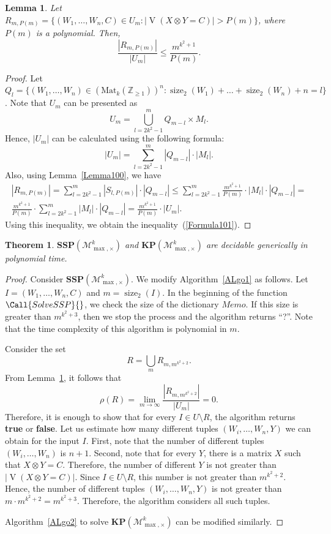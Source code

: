 \documentclass[reqno,12pt]{amsart}
\newtheorem{lemma}{Lemma}
\newtheorem{theorem}{Theorem}
\theoremstyle{definition}
\newcommand{\Mat}{\mathrm{Mat}}
\newcommand{\MT}{\mathcal{M}_{\max, {\times}}^k}
\newcommand{\SSMTP}{\mathbf{SSP}(\MT)}
\newcommand{\KMTP}{\mathbf{KP}(\MT)}
\DeclareMathOperator{\size}{size}
\DeclareMathOperator{\V}{\mathrm{V}}
\begin{document}
\begin{lemma}\label{LemmaRm}
Let $R_{m, P(m)} = \{(W_1, \ldots, W_n, C) \in U_m : |\!\V(X \otimes Y = C)| > P(m)\}$, where $P(m)$ is a polynomial.
Then,
\begin{equation}\label{Formula101}
\frac{|R_{m, P(m)}|}{|U_m|} \leq \frac{m^{k^2 + 1}}{P(m)}.
\end{equation}
\end{lemma}

\begin{proof}
Let $Q_l = \{ (W_1, \ldots, W_n) \in (\Mat_k(\mathbb{Z}_{\geq 1}))^n: \size_2(W_1) + \ldots + \size_2(W_n) + n = l\}$. Note that $U_m$ can be presented as
$$U_m = \bigcup_{l = 2k^2 - 1}^m Q_{m - l} \times M_l.$$ Hence,
$|U_m|$ can be calculated using the following formula:
$$
|U_m| = \sum_{l = 2k^2 - 1}^m |Q_{m - l}| \cdot |M_l|. 
$$
Also, using Lemma~\ref{Lemma100}, we have
\begin{multline*}
|R_{m, P(m)}| = \sum_{l = 2k^2 - 1}^m |S_{l, P(m)}| \cdot |Q_{m - l}|
\leq
\sum_{l = 2k^2 - 1}^m 
\frac{m^{k^2 + 1}}{P(m)}
\cdot|M_l| \cdot |Q_{m - l}|
=\\
\frac{m^{k^2 + 1}}{P(m)}\cdot
\sum_{l = 2k^2 - 1}^m 
|M_l| \cdot |Q_{m - l}|
=
\frac{m^{k^2 + 1}}{P(m)} \cdot |U_m|.
\end{multline*}
Using this inequality, we obtain the inequality~(\ref{Formula101}).
\end{proof}

\begin{theorem}\label{Th3}
$\SSMTP$ and $\KMTP$ are decidable generically in polynomial time.
\end{theorem}
\begin{proof}
Consider $\SSMTP$. We modify Algorithm~\ref{ALgo1} as follows. 
Let $I = (W_1, \ldots, W_n, C)$ and $m = \size_2(I)$.
In the beginning of the function $\Call{SolveSSP}{}$,
we check the size of the dictionary $Memo$. If this size is greater than
$m^{k^2 + 3}$, then we stop the process and the algorithm returns ``?''.
Note that the time complexity of this algorithm is polynomial in $m$.

Consider the set 
$$R = \bigcup_{m}{R_{m, m^{k^2 + 2}}}.$$ From Lemma~\ref{LemmaRm},
 it follows that 
$$\rho(R) = \lim_{m \to \infty}\frac{|R_{m, m^{k^2 + 2}}|}{|U_m|} = 0.$$
Therefore, it is enough to show that for every $I \in U \setminus R$,
the algorithm returns \textbf{true} or \textbf{false}.
Let us estimate how many different tuples $(W_i, \ldots, W_n, Y)$ we can obtain for the input $I$. 
First, note that the number of different tuples $(W_i, \ldots, W_n)$
is $n + 1$. Second, note that for every $Y$, there is a matrix $X$ such that $X \otimes Y = C$. Therefore, the number of different $Y$ is not greater than
$|\!\V(X \otimes Y = C)|$. Since $I\in U \setminus R$, this number is not greater than
$m^{k^2 + 2}$. Hence, the number of different tuples $(W_i, \ldots, W_n, Y)$ is not greater than $m \cdot m^{k^2 + 2} = m^{k^2 + 3}$. Therefore, the algorithm considers all such tuples. 

Algorithm~\ref{ALgo2} to solve $\KMTP$ can be modified similarly.
\end{proof}
\end{document}
